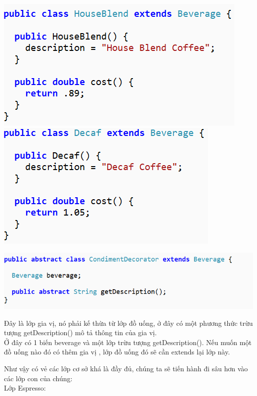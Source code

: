 \begin{multicols}{2}
	\includegraphics[width=0.9\columnwidth]{GALLEYS/images/chapter4/images4}
	\includegraphics[width=0.9\columnwidth]{GALLEYS/images/chapter4/images5}
\end{multicols}
\begin{center}
	\includegraphics{GALLEYS/images/chapter4/images2}
\end{center}
Đây là lớp gia vị, nó phải kế thừa từ lớp đồ uống, ở đây có một phương thức trừu tượng getDescription() mô tả thông tin của gia vị.\\
Ở đây có 1 biến beverage và một lớp trừu tượng getDescription().
Nếu muốn một đồ uống nào đó có thêm gia vị , lớp đồ uống đó sẽ cần extends lại lớp này.

Như vậy có vẻ các lớp cơ sở khá là đầy đủ, chúng ta sẽ tiến hành đi sâu hơn vào các lớp con của chúng:\\
Lớp Espresso:\\

